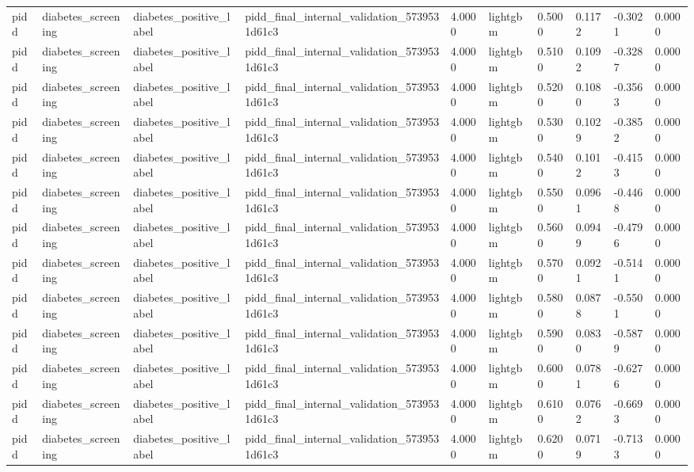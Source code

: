 \begin{tabular}{llllllllll}
pidd & diabetes\_screening & diabetes\_positive\_label & pidd\_final\_internal\_validation\_5739531d61c3 & 4.0000 & lightgbm & 0.5000 & 0.1172 & -0.3021 & 0.0000 \\
pidd & diabetes\_screening & diabetes\_positive\_label & pidd\_final\_internal\_validation\_5739531d61c3 & 4.0000 & lightgbm & 0.5100 & 0.1092 & -0.3287 & 0.0000 \\
pidd & diabetes\_screening & diabetes\_positive\_label & pidd\_final\_internal\_validation\_5739531d61c3 & 4.0000 & lightgbm & 0.5200 & 0.1080 & -0.3563 & 0.0000 \\
pidd & diabetes\_screening & diabetes\_positive\_label & pidd\_final\_internal\_validation\_5739531d61c3 & 4.0000 & lightgbm & 0.5300 & 0.1029 & -0.3852 & 0.0000 \\
pidd & diabetes\_screening & diabetes\_positive\_label & pidd\_final\_internal\_validation\_5739531d61c3 & 4.0000 & lightgbm & 0.5400 & 0.1012 & -0.4153 & 0.0000 \\
pidd & diabetes\_screening & diabetes\_positive\_label & pidd\_final\_internal\_validation\_5739531d61c3 & 4.0000 & lightgbm & 0.5500 & 0.0961 & -0.4468 & 0.0000 \\
pidd & diabetes\_screening & diabetes\_positive\_label & pidd\_final\_internal\_validation\_5739531d61c3 & 4.0000 & lightgbm & 0.5600 & 0.0949 & -0.4796 & 0.0000 \\
pidd & diabetes\_screening & diabetes\_positive\_label & pidd\_final\_internal\_validation\_5739531d61c3 & 4.0000 & lightgbm & 0.5700 & 0.0921 & -0.5141 & 0.0000 \\
pidd & diabetes\_screening & diabetes\_positive\_label & pidd\_final\_internal\_validation\_5739531d61c3 & 4.0000 & lightgbm & 0.5800 & 0.0878 & -0.5501 & 0.0000 \\
pidd & diabetes\_screening & diabetes\_positive\_label & pidd\_final\_internal\_validation\_5739531d61c3 & 4.0000 & lightgbm & 0.5900 & 0.0830 & -0.5879 & 0.0000 \\
pidd & diabetes\_screening & diabetes\_positive\_label & pidd\_final\_internal\_validation\_5739531d61c3 & 4.0000 & lightgbm & 0.6000 & 0.0781 & -0.6276 & 0.0000 \\
pidd & diabetes\_screening & diabetes\_positive\_label & pidd\_final\_internal\_validation\_5739531d61c3 & 4.0000 & lightgbm & 0.6100 & 0.0762 & -0.6693 & 0.0000 \\
pidd & diabetes\_screening & diabetes\_positive\_label & pidd\_final\_internal\_validation\_5739531d61c3 & 4.0000 & lightgbm & 0.6200 & 0.0719 & -0.7133 & 0.0000 \\

\end{tabular}
